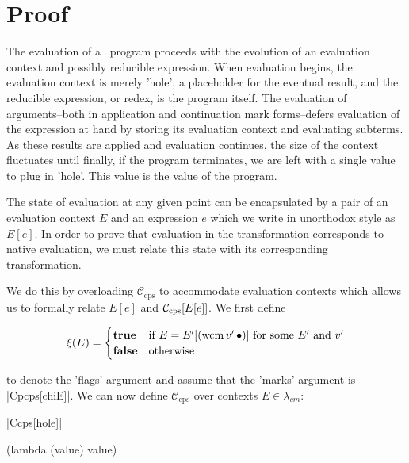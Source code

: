 \chapter{Proof}


The evaluation of a \cm\ program proceeds with the evolution of an evaluation context and possibly reducible expression. When evaluation begins, the evaluation context is merely \scheme'hole', a placeholder for the eventual result, and the reducible expression, or redex, is the program itself. The evaluation of arguments--both in application and continuation mark forms--defers evaluation of the expression at hand by storing its evaluation context and evaluating subterms. As these results are applied and evaluation continues, the size of the context fluctuates until finally, if the program terminates, we are left with a single value to plug in \scheme'hole'. This value is the value of the program.

The state of evaluation at any given point can be encapsulated by a pair of an evaluation context $E$ and an expression $e$ which we write in unorthodox style as $E[e]$. In order to prove that evaluation in the transformation corresponds to native evaluation, we must relate this state with its corresponding transformation.

We do this by overloading $\mathcal{C}_{\mathrm{cps}}$ to accommodate evaluation contexts which allows us to formally relate $E[e]$ and $\mathcal{C}_{\mathrm{cps}}[E[e]]$. We first define
\begin{definition}
\[
\xi(E)=\begin{cases}
\mathbf{true} &\text{if $E=E'[(\mathrm{wcm}\,v'\,\bullet)]$ for some $E'$ and $v'$}\\
\mathbf{false} &\text{otherwise}
\end{cases}
\]
\end{definition}
\noindent
to denote the \scheme'flags' argument and assume that the \scheme'marks' argument is \scheme|Cpcps[chiE]|. We can now define $\mathcal{C}_{\mathrm{cps}}$ over contexts $E\in\lambda_{cm}$:

\begin{schemedefinition}{\scheme|Ccps[hole]|}
\begin{schemeblock}
\begin{schemedisplay}
(lambda (value)
  value)
\end{schemedisplay}
\end{schemeblock}
\end{schemedefinition}

